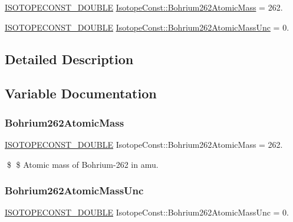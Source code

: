 \begin{DoxyCompactItemize}
\item 
\mbox{\hyperlink{group___isotope_const-_macros_ga8f45a7272ce02c0b4c65c44636ed719a}{I\+S\+O\+T\+O\+P\+E\+C\+O\+N\+S\+T\+\_\+\+D\+O\+U\+B\+LE}} \mbox{\hyperlink{group___isotope_const-_bohrium-_bh262_ga6caba707b501efb69bec0ffec9643e38}{Isotope\+Const\+::\+Bohrium262\+Atomic\+Mass}} = 262.
\item 
\mbox{\hyperlink{group___isotope_const-_macros_ga8f45a7272ce02c0b4c65c44636ed719a}{I\+S\+O\+T\+O\+P\+E\+C\+O\+N\+S\+T\+\_\+\+D\+O\+U\+B\+LE}} \mbox{\hyperlink{group___isotope_const-_bohrium-_bh262_gacc7863ca45a1b9f27a730d30ebd5fb06}{Isotope\+Const\+::\+Bohrium262\+Atomic\+Mass\+Unc}} = 0.
\end{DoxyCompactItemize}


\subsection{Detailed Description}


\subsection{Variable Documentation}
\mbox{\label{group___isotope_const-_bohrium-_bh262_ga6caba707b501efb69bec0ffec9643e38}} 
\subsubsection{\texorpdfstring{Bohrium262\+Atomic\+Mass}{Bohrium262AtomicMass}}
{\footnotesize\ttfamily \mbox{\hyperlink{group___isotope_const-_macros_ga8f45a7272ce02c0b4c65c44636ed719a}{I\+S\+O\+T\+O\+P\+E\+C\+O\+N\+S\+T\+\_\+\+D\+O\+U\+B\+LE}} Isotope\+Const\+::\+Bohrium262\+Atomic\+Mass = 262.}

\$ \$ Atomic mass of Bohrium-\/262 in amu. \mbox{\label{group___isotope_const-_bohrium-_bh262_gacc7863ca45a1b9f27a730d30ebd5fb06}} 
\subsubsection{\texorpdfstring{Bohrium262\+Atomic\+Mass\+Unc}{Bohrium262AtomicMassUnc}}
{\footnotesize\ttfamily \mbox{\hyperlink{group___isotope_const-_macros_ga8f45a7272ce02c0b4c65c44636ed719a}{I\+S\+O\+T\+O\+P\+E\+C\+O\+N\+S\+T\+\_\+\+D\+O\+U\+B\+LE}} Isotope\+Const\+::\+Bohrium262\+Atomic\+Mass\+Unc = 0.}

